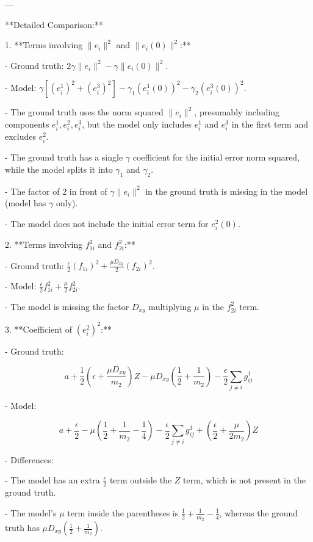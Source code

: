 \documentclass[10pt]{article}
\begin{document}
---

**Detailed Comparison:**

1. **Terms involving \(\|e_i\|^2\) and \(\|e_i(0)\|^2\):**

- Ground truth: \(2 \gamma \|e_i\|^2 - \gamma \|e_i(0)\|^2\).

- Model: \(\gamma[(e_i^1)^2 + (e_i^3)^2] - \gamma_1 (e_i^1(0))^2 - \gamma_2 (e_i^3(0))^2\).

- The ground truth uses the norm squared \(\|e_i\|^2\), presumably including components \(e_i^1, e_i^2, e_i^3\), but the model only includes \(e_i^1\) and \(e_i^3\) in the first term and excludes \(e_i^2\).

- The ground truth has a single \(\gamma\) coefficient for the initial error norm squared, while the model splits it into \(\gamma_1\) and \(\gamma_2\).

- The factor of 2 in front of \(\gamma \|e_i\|^2\) in the ground truth is missing in the model (model has \(\gamma\) only).

- The model does not include the initial error term for \(e_i^2(0)\).

2. **Terms involving \(f_{1i}^2\) and \(f_{2i}^2\):**

- Ground truth: \(\frac{\epsilon}{2} (f_{1i})^2 + \frac{\mu D_{xy}}{2} (f_{2i})^2\).

- Model: \(\frac{\epsilon}{2} f_{1i}^2 + \frac{\mu}{2} f_{2i}^2\).

- The model is missing the factor \(D_{xy}\) multiplying \(\mu\) in the \(f_{2i}^2\) term.

3. **Coefficient of \((e_i^2)^2\):**

- Ground truth:

\[
a + \frac{1}{2} \left( \epsilon + \frac{\mu D_{xy}}{m_2} \right) Z - \mu D_{xy} \left( \frac{1}{2} + \frac{1}{m_2} \right) - \frac{\epsilon}{2} \sum_{j \neq i} g_{ij}^1
\]

- Model:

\[
a + \frac{\epsilon}{2} - \mu \left( \frac{1}{2} + \frac{1}{m_2} - \frac{1}{4} \right) - \frac{\epsilon}{2} \sum_{j \neq i} g_{ij}^1 + \left( \frac{\epsilon}{2} + \frac{\mu}{2 m_2} \right) Z
\]

- Differences:

  - The model has an extra \(\frac{\epsilon}{2}\) term outside the \(Z\) term, which is not present in the ground truth.

  - The model's \(\mu\) term inside the parentheses is \(\frac{1}{2} + \frac{1}{m_2} - \frac{1}{4}\), whereas the ground truth has \(\mu D_{xy} \left( \frac{1}{2} + \frac{1}{m_2} \right)\).
\end{document}
